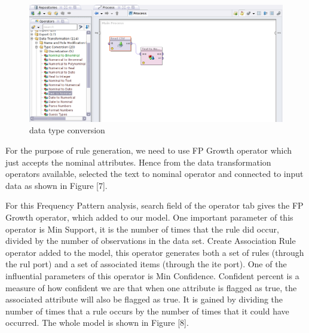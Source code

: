 \documentclass{article}\usepackage[]{graphicx}\usepackage[]{color}
\begin{document}
\begin{figure}[h]
\begin{center}
\includegraphics [scale=0.40]{conv.png}
\end{center}
\caption{data type conversion}
\end{figure}


For the purpose of rule generation, we need to use FP Growth operator which just accepts the nominal attributes. Hence from the data transformation operators available, selected the text to nominal operator and connected to input data as shown in Figure [7].\par
For this Frequency Pattern analysis, search field of the operator tab gives the FP Growth operator, which added to our model. One important parameter of this operator is Min Support, it is the number of times that the rule did occur, divided by the number of observations in the data set. Create Association Rule operator added to the model, this operator generates both a set of rules (through the rul port) and a set of associated items (through the ite port). One of the influential parameters of this operator is Min Confidence. Confident percent is a measure of how confident we are that when one attribute is flagged as true, the associated attribute will also be flagged as true. It is gained by dividing the number of times that a rule occurs by the number of times that it could have occurred. The whole model is shown in Figure [8].\par
\end{document}
